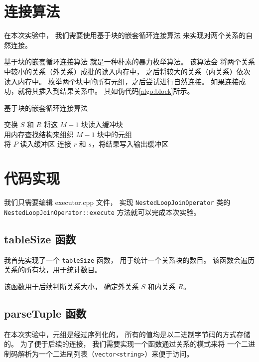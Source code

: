 \documentclass[12pt,onecolumn]{report}
\theoremstyle{plain}
\numberwithin{figure}{chapter}
\numberwithin{table}{chapter}
\numberwithin{lstlisting}{chapter}
\begin{document}
\chapter{连接算法}
在本次实验中，
我们需要使用基于块的嵌套循环连接算法
来实现对两个关系的自然连接。

基于块的嵌套循环连接算法
就是一种朴素的暴力枚举算法。
该算法会
将两个关系中较小的关系（外关系）成批的读入内存中，
之后将较大的关系（内关系）依次读入内存中。
枚举两个块中的所有元组，之后尝试进行自然连接。
如果连接成功，就将其插入到结果关系中。
其如伪代码\ref{algo:block}所示。

\begin{algorithm}
  \caption{基于块的嵌套循环连接算法\label{algo:block}}

   {
    交换 $S$ 和 $R$
  }
   {
    将这 $M - 1$ 块读入缓冲块 \\
    用内存查找结构来组织 $M - 1$ 块中的元组 \\
     {
      将 $P$ 读入缓冲区
       {
         {
          连接 $r$ 和 $s$，将结果写入输出缓冲区
        }
      }
    }
  }

\end{algorithm}

\chapter{代码实现}
我们只需要编辑 executor.cpp 文件，
实现 \lstinline|NestedLoopJoinOperator| 类的
\lstinline|NestedLoopJoinOperator::execute| 方法就可以完成本次实验。

\section{tableSize 函数}
我首先实现了一个 \lstinline|tableSize| 函数，
用于统计一个关系块的数目。
该函数会遍历关系的所有块，用于统计数目。

该函数用于后续判断关系大小，
确定外关系 $S$ 和内关系 $R$。

\section{parseTuple 函数}
在本次实验中，元组是经过序列化的，
所有的值均是以二进制字节码的方式存储的。
为了便于后续的连接，
我们需要实现一个函数通过关系的模式来将
一个二进制码解析为一个二进制列表（\lstinline|vector<string>|）来便于访问。
\end{document}
